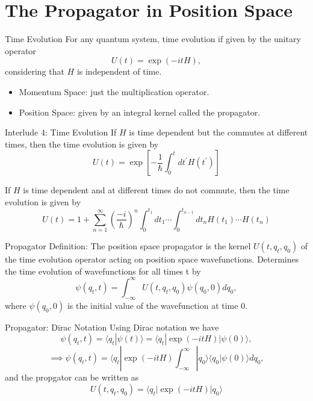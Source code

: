 \documentclass[12pt]{beamer}
\begin{document}
\section{The Propagator in Position Space}
\begin{frame}{Time Evolution}
For any quantum system, time evolution if given by the unitary operator 
\begin{displaymath}
  U(t) = \exp(-itH),
\end{displaymath}
considering that $H$ is independent of time.
\begin{itemize}
	\item Momentum Space: just the multiplication operator.
	\item Position Space: given by an integral kernel called the propagator.
\end{itemize}
\end{frame}
\begin{frame}{Interlude 4: Time Evolution}
If $H$ is time dependent but the commutes at different times, then the time evolution is given by 
\begin{displaymath}
U(t) = \exp[-\frac{1}{\hbar}\int_{0}^{t}dt^{\prime}H(t^{\prime})]
\end{displaymath}

If $H$ is time dependent and at different times do not commute, then the time evolution is given by
\begin{displaymath}
	U(t) = 1+\sum_{n=1}^{\infty} (\frac{-i}{\hbar})^n\int_{0}^{t_1}dt_{1}\cdots\int_{0}^{t_{n-1}}dt_n H(t_1)\cdots H(t_n)
\end{displaymath}
\end{frame}
\begin{frame}{Propagator}
Definition: The position space propagator is the kernel $U(t, q_t, q_0)$ of the time evolution operator acting on position space wavefunctions. Determines the time evolution of wavefunctions for all times t by
\begin{displaymath}
  \psi(q_t,t) = \int_{-\infty}^{\infty} U(t, q_t, q_0)\psi(q_0,0)dq_0,
\end{displaymath}
where $\psi(q_0,0)$ is the initial value of the wavefunction at time 0.
\end{frame}
\begin{frame}{Propagator: Dirac Notation}
Using Dirac notation we have
\begin{displaymath}
  \psi(q_t,t) = \langle q_t|\psi(t)\rangle = \langle q_t|\exp(-itH)|\psi(0)\rangle,
\end{displaymath}
\begin{displaymath}
  \implies \psi(q_t,t) = \langle q_t|\exp(-itH)\int_{-\infty}^{\infty}|q_0\rangle\langle q_0|\psi(0)\rangle dq_0,
\end{displaymath}
and the propgator can be written as 
\begin{displaymath}
  U(t,q_t,q_0) = \langle q_t|\exp(-itH)|q_0\rangle
\end{displaymath}
\end{frame}
\end{document}
